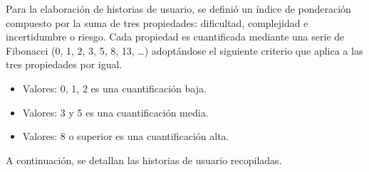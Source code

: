 \documentclass[
11pt, %
]{charter}
\begin{document}
%
%
Para la elaboración de historias de usuario, se definió un índice de ponderación compuesto por la suma de tres propiedades: dificultad, complejidad e incertidumbre o riesgo. Cada propiedad es cuantificada mediante una serie de Fibonacci (0, 1, 2, 3, 5, 8, 13, …) adoptándose el siguiente criterio que aplica a las tres propiedades por igual.
\begin{itemize}
\item Valores: 0, 1, 2 es una cuantificación baja.
\item Valores: 3 y 5 es una cuantificación media.
\item Valores: 8 o superior es una cuantificación alta.
\end{itemize}

A continuación, se detallan las historias de usuario recopiladas.
\end{document}

